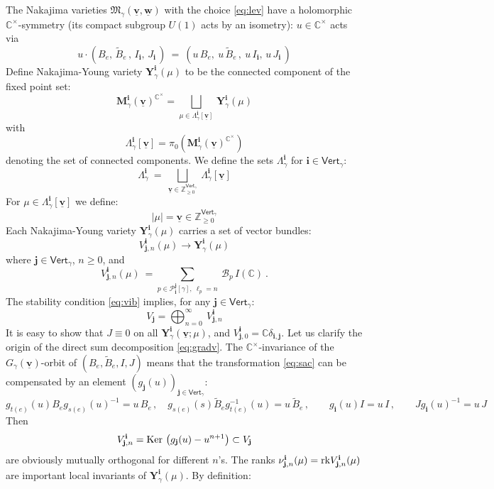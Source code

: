 \documentclass[12pt]{amsart}
\newcommand {\3}{\underline{\bf 3}}
\newcommand {\4}{\underline{\bf 4}}
\newcommand {\6}{\underline{\bf 6}}
\newcommand{\beq}{\begin{equation}}
\newcommand{\eeq}{\end{equation}}
\newcommand{\mM}{{\mathfrak M}}
\newcommand {\BC}   {\mathbb C}
\newcommand {\bM}   {\mathbf{M}}
\newcommand {\bY}   {\mathbf{Y}}
\newcommand {\ib} {\mathbf{i}}
\newcommand {\jb} {\mathbf{j}}
\newcommand {\bv} {\underline{\mathbf{v}}}
\newcommand {\bw} {\underline{\mathbf{w}}}
\newcommand {\BZ}   {\mathbb Z}
\newcommand {\CalB} {\mathcal B}
\newcommand {\CalP} {\mathcal P}
\newcommand{\Vg}{\mathsf{Vert}_{\gamma}}
\begin{document}
The Nakajima varieties ${\mM}_{\gamma}({\bv}, {\bw})$ with the choice
\eqref{eq:lev} have a holomorphic ${\BC}^{\times}$-symmetry (its compact subgroup $U(1)$ acts by an isometry): $u \in {\BC}^{\times}$ acts via
\beq
u  \cdot \left( B_{e}, \, {\tilde B}_{e} \, , \, I_{\ib}, \, J_{\ib} \, \right)  \ = \ \left( u\, B_{e}, \ u\, {\tilde B}_{e} \, , \ u\, I_{\ib}, \, u\, J_{\ib} \, \right)
\label{eq:sac}
\eeq
Define Nakajima-Young variety
${\bY}_{\gamma}^{\ib} ({\mu})$ to be the connected component of the
fixed point set:
\beq
{\bM}_{\gamma}^{\ib} ({\bv})^{{\BC}^{\times}} = \bigsqcup_{{\mu} \in {\Lambda}_{\gamma}^{\ib} [{\bv}]} \, {\bY}_{\gamma}^{\ib} ( {\mu} )
\eeq
with 
\beq
{\Lambda}_{\gamma}^{\ib} [{\bv}] = {\pi}_{0}\left( {\bM}_{\gamma}^{\ib} ({\bv})^{{\BC}^{\times}}  \right)
\eeq denoting the set of connected components. 
We define the sets ${\Lambda}^{\ib}_{\gamma}$ for ${\ib} \in \Vg$:
\beq
{\Lambda}^{\ib}_{\gamma}  \ = \ \bigsqcup\limits_{{\bv} \in {\BZ}_{\geq 0}^{\Vg}} \ 
{\Lambda}^{\ib}_{\gamma} \left[ {\bv} \right]
\label{eq:nycc}
\eeq
For $\mu \in {\Lambda}^{\ib}_{\gamma} \left[ {\bv} \right]$ we define:
\beq
| {\mu} | = {\bv} \in {\BZ}_{\geq 0}^{\Vg}
\eeq
Each Nakajima-Young variety ${\bY}_{\gamma}^{\ib} ({\mu})$ carries a set of vector bundles:
\beq
V_{{\jb}, n}^{\ib} ({\mu}) \longrightarrow {\bY}_{\gamma}^{\ib} ({\mu})
\eeq
where ${\jb} \in \Vg$, $n \geq 0$, and
\beq
V_{{\jb}, n}^{\ib} ({\mu})
 \ = \sum_{p \in {\CalP}_{{\ib}}^{\jb}[{\gamma}], \ {\ell}_{p} = n}\ {\CalB}_{p} \, I ({\BC}) \ .
 \label{eq:gradvii}
 \eeq 
 The stability condition \eqref{eq:vib} implies, for any $\jb \in \Vg$:
 \beq
 V_{\jb} = \bigoplus_{n=0}^{\infty} \ V_{\jb, n}^{\ib}
 \label{eq:gradv}
 \eeq
 It is easy to show that $J \equiv 0$ on all $ {\bY}_{\gamma}^{\ib} ({\bv}; {\mu})$, and $V_{\jb,0}^{\ib} = {\BC} {\delta}_{\ib , \jb}$. Let us clarify the origin of the direct sum decomposition 
 \eqref{eq:gradv}. The ${\BC}^{\times}$-invariance of the $G_{\gamma}({\bv})$-orbit of
 $(B_{e}, {\tilde B}_{e}, I, J)$ means that the transformation \eqref{eq:sac} can be compensated by an element $(g_{\jb}(u))_{\jb \in \Vg}$:
 \beq
 g_{t(e)} (u) B_{e} g_{s(e)}(u)^{-1} = u\, B_{e}\, , \quad g_{s(e)} (s) {\tilde B}_{e} g_{t(e)}^{-1}(u) = u\, {\tilde B}_{e}\, , \qquad g_{\ib}(u) I = u\, I\, , \qquad J g_{\ib}(u)^{-1}  = u\, J \label{eq:bijs}
 \eeq
Then 
\beq
V_{\jb, n}^{\ib} = {\rm Ker}\, \left( g_{\jb}(u) - u^{n+1} \right)  \subset V_{\jb}
\eeq 
are obviously mutually orthogonal for different $n$'s. 
The ranks ${\nu}_{\jb, n}^{\ib} ({\mu}) = 
{\rm rk}V_{{\jb}, n}^{\ib} ({\mu})$
are important local invariants of ${\bY}_{\gamma}^{\ib} ({\mu})$. By definition:
\end{document}
